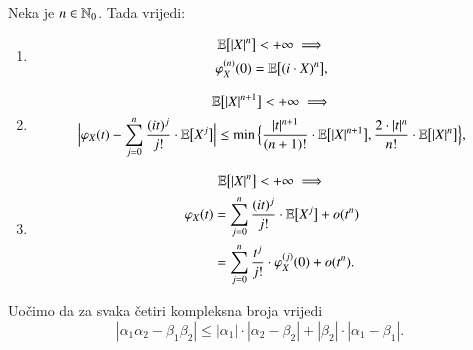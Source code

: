 \begin{kor} \label{kor:17.7}
    Neka je $n \in \mathbb{N}_0$.
    Tada vrijedi:
    \begin{enumerate}[label=(\roman*)]
        \item \label{kor:17.7.1}
        \begin{equation*}
            \begin{gathered}
                \mathbb{E} \big[ |X|^n \big] < +\infty \implies\\
                \varphi_X^{(n)}(0) = \mathbb{E} \big[ (i \cdot X)^n \big],
            \end{gathered}
        \end{equation*}
        \item \label{kor:17.7.2}
        \begin{equation*}
            \begin{gathered}
                \mathbb{E} \big[|X|^{n + 1} \big] < +\infty \implies\\
                \Big| \varphi_X (t) - \sum\limits_{j = 0}^{n} \frac{(it)^j}{j !} \cdot \mathbb{E} \big[ X^j \big]  \Big| \leq \min \Big\{ \frac{|t|^{n+1}}{(n + 1)!} \cdot \mathbb{E} \big[ |X|^{n + 1} \big], \frac{2 \cdot |t|^n}{n !} \cdot \mathbb{E} \big[ |X|^n \big] \Big\},
            \end{gathered}
        \end{equation*}
        \item \label{kor:17.7.3}
        \begin{equation*}
            \begin{gathered}
                \mathbb{E} \big[ |X|^n \big] < +\infty \implies\\
                \begin{aligned}
                    \varphi_X (t) &= \sum\limits_{j = 0}^{n} \frac{(i t)^j}{j!} \cdot \mathbb{E} \big[ X^j \big] + o (t^n)\\
                    &= \sum\limits_{j = 0}^{n} \frac{t^j}{j!} \cdot \varphi_X^{(j) } (0) + o(t^n).
                \end{aligned}
            \end{gathered}
        \end{equation*}
    \end{enumerate}
\end{kor}

Uo\v cimo da za svaka \v cetiri kompleksna broja vrijedi
\begin{equation}    \label{jed:17.8}
    |\alpha_1 \alpha_2 - \beta_1 \beta_2| \leq |\alpha_1| \cdot | \alpha_2 - \beta_2| + |\beta_2| \cdot | \alpha_1 - \beta_1|.
\end{equation}

